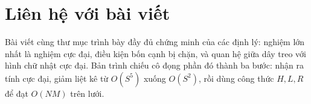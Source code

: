 \documentclass[11pt]{article}
\begin{document}
\section{Liên hệ với bài viết}

Bài viết cùng thư mục trình bày đầy đủ chứng minh của các định lý: nghiệm lớn
nhất là nghiệm cực đại, điều kiện bốn cạnh bị chặn, và quan hệ giữa dây treo
với hình chữ nhật cực đại. Bản trình chiếu cô đọng phần đó thành ba bước:
nhận ra tính cực đại, giảm liệt kê từ \(O(S^5)\) xuống \(O(S^2)\), rồi dùng
công thức \(H,L,R\) để đạt \(O(NM)\) trên lưới.
\end{document}
